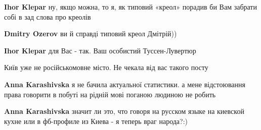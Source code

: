 \begin{itemize}
\begin{itemize}
\textbf{Ihor Klepar} ну, якщо можна, то я, як типовий «креол» порадив би Вам забрати собі в зад слова про креолів

 
\textbf{Dmitry Ozerov} ви й справді типовий креол Дмітрій))

 
\textbf{Ihor Klepar} для Вас - так. Ваш особистий Туссен-Лувертюр

\end{itemize}

 

Київ уже не російськомовне місто. Не чекала від вас такого посту

\begin{itemize}
 
\textbf{Anna Karashivska} я не бачила актуальної статистики. а мене відстоювання права говорити в побуті на рідній мові поганою людиною не робить

 
\textbf{Anna Karashivska} значит ли это, что говоря на русском языке на киевской кухне или в фб-профиле из Киева - я теперь враг народа?:)

 

\end{itemize}
\end{itemize}
